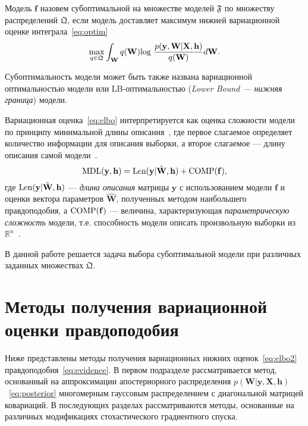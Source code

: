 Модель $\mathbf{f}$ назовем субоптимальной на множестве моделей $\mathfrak{F}$  по множеству распределений $\mathfrak{Q}$, если модель доставляет максимум нижней вариационной оценке интеграла~\eqref{eq:optim}
\begin{equation}
\label{eq:elbo2}
	\max_{q \in \mathfrak{Q}}\int_{\mathbf{W}} q(\mathbf{W})\textnormal{log}~\frac{p(\mathbf{y},\mathbf{W}|\mathbf{X},\mathbf{h})}{q(\mathbf{W})}d\mathbf{W}.
\end{equation}


\begin{defin}
Субоптимальность модели может быть также названа вариационной оптимальностью модели или LB-оптимальностью (\textit{Lower Bound --- нижняя граница}) модели.
\end{defin}

Вариационная оценка~\eqref{eq:elbo} интерпретируется как оценка сложности модели по принципу минимальной длины описания~\cite{mdl}, где первое слагаемое определяет количество информации для описания выборки, а второе слагаемое --- длину описания самой модели~\cite{nips}.
\[
	\textnormal{MDL}(\mathbf{y},\mathbf{h}) = \textnormal{Len}(\mathbf{y}|\hat{\mathbf{W}},\mathbf{h}) + \textnormal{COMP}(\mathbf{f}),
\]
где  $\textnormal{Len}(\mathbf{y}|\hat{\mathbf{W}},\mathbf{h})$ --- \emph{длина описания} матрицы $\mathbf{y}$ с использованием модели $\mathbf{f}$ и оценки вектора параметров $\hat{\mathbf{W}}$, полученных методом наибольшего правдоподобия, а $\textnormal{COMP}(\mathbf{f})$ --- величина, характеризующая \emph{параметрическую сложность} модели, т.е. способность модели описать произвольную выборки из $\mathbb{R}^n$~\cite{grun}.


В данной работе решается задача выбора субоптимальной модели при различных заданных множествах $\mathfrak{Q}$.

\section{Методы получения вариационной оценки правдоподобия}
Ниже представлены методы получения вариационных нижних оценок~\eqref{eq:elbo2} правдоподобия~\eqref{eq:evidence}. В первом подразделе рассматривается метод, основанный на аппроксимации апостериорного распределения $p( \mathbf{W}|\mathbf{y}, \mathbf{X}, \mathbf{h})$~\eqref{eq:posterior} многомерным гауссовым распределением с диагональной матрицей ковариаций. В последующих разделах рассматриваются методы, основанные на различных модификациях стохастического градиентного спуска. 

